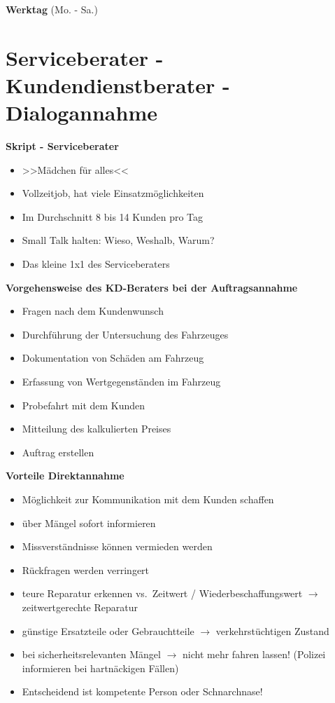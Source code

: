 \textbf{Werktag} (Mo. - Sa.)

\newpage

\section{Serviceberater - Kundendienstberater -
Dialogannahme}\label{serviceberater-kundendienstberater-dialogannahme}

\textbf{Skript - Serviceberater}

\begin{itemize}
\item
  >>Mädchen für alles<<
\item
  Vollzeitjob, hat viele Einsatzmöglichkeiten
\item
  Im Durchschnitt 8 bis 14 Kunden pro Tag
\item
  Small Talk halten: Wieso, Weshalb, Warum?
\item
  Das kleine 1x1 des Serviceberaters
\end{itemize}

\textbf{Vorgehensweise des KD-Beraters bei der Auftragsannahme}

\begin{itemize}
\item
  Fragen nach dem Kundenwunsch
\item
  Durchführung der Untersuchung des Fahrzeuges
\item
  Dokumentation von Schäden am Fahrzeug
\item
  Erfassung von Wertgegenständen im Fahrzeug
\item
  Probefahrt mit dem Kunden
\item
  Mitteilung des kalkulierten Preises
\item
  Auftrag erstellen
\end{itemize}

\textbf{Vorteile Direktannahme}

\begin{itemize}
\item
  Möglichkeit zur Kommunikation mit dem Kunden schaffen
\item
  über Mängel sofort informieren
\item
  Missverständnisse können vermieden werden
\item
  Rückfragen werden verringert
\item
  teure Reparatur erkennen vs.~Zeitwert / Wiederbeschaffungswert $\to$
  zeitwertgerechte Reparatur
\item
  günstige Ersatzteile oder Gebrauchtteile $\to$ verkehrstüchtigen
  Zustand
\item
  bei sicherheitsrelevanten Mängel $\to$ nicht mehr fahren lassen!
  (Polizei informieren bei hartnäckigen Fällen)
\item
  Entscheidend ist kompetente Person oder Schnarchnase!
\end{itemize}

